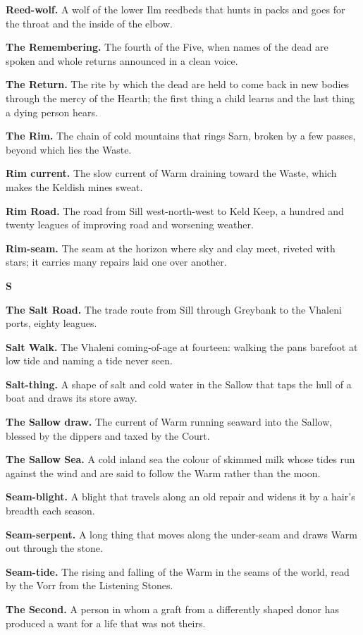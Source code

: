 \documentclass{design/chronicle}
\begin{document}
\textbf{Reed-wolf.} A wolf of the lower Ilm reedbeds that hunts in packs and goes for the throat and the inside of the elbow.

\textbf{The Remembering.} The fourth of the Five, when names of the dead are spoken and whole returns announced in a clean voice.

\textbf{The Return.} The rite by which the dead are held to come back in new bodies through the mercy of the Hearth; the first thing a child learns and the last thing a dying person hears.

\textbf{The Rim.} The chain of cold mountains that rings Sarn, broken by a few passes, beyond which lies the Waste.

\textbf{Rim current.} The slow current of Warm draining toward the Waste, which makes the Keldish mines sweat.

\textbf{Rim Road.} The road from Sill west-north-west to Keld Keep, a hundred and twenty leagues of improving road and worsening weather.

\textbf{Rim-seam.} The seam at the horizon where sky and clay meet, riveted with stars; it carries many repairs laid one over another.

\textbf{S}

\textbf{The Salt Road.} The trade route from Sill through Greybank to the Vhaleni ports, eighty leagues.

\textbf{Salt Walk.} The Vhaleni coming-of-age at fourteen: walking the pans barefoot at low tide and naming a tide never seen.

\textbf{Salt-thing.} A shape of salt and cold water in the Sallow that taps the hull of a boat and draws its store away.

\textbf{The Sallow draw.} The current of Warm running seaward into the Sallow, blessed by the dippers and taxed by the Court.

\textbf{The Sallow Sea.} A cold inland sea the colour of skimmed milk whose tides run against the wind and are said to follow the Warm rather than the moon.

\textbf{Seam-blight.} A blight that travels along an old repair and widens it by a hair’s breadth each season.

\textbf{Seam-serpent.} A long thing that moves along the under-seam and draws Warm out through the stone.

\textbf{Seam-tide.} The rising and falling of the Warm in the seams of the world, read by the Vorr from the Listening Stones.

\textbf{The Second.} A person in whom a graft from a differently shaped donor has produced a want for a life that was not theirs.
\end{document}
